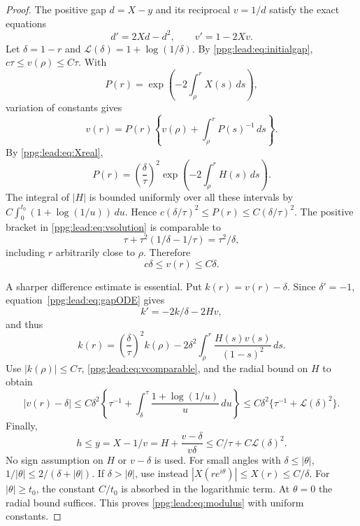 \documentclass[11pt,letterpaper]{article}
\theoremstyle{remark}\newtheorem{remark}[theorem]{Remark}
\numberwithin{equation}{section}
\begin{document}
\begin{proof}
The positive gap $d=X-y$ and its reciprocal $v=1/d$ satisfy the exact equations
\begin{equation}\label{ppg:lead:eq:gapODE}
 d'=2Xd-d^2,\qquad v'=1-2Xv.
\end{equation}
Let $\delta=1-r$ and $\mathcal L(\delta)=1+\log(1/\delta)$. By \eqref{ppg:lead:eq:initialgap}, $c\tau\le v(\rho)\le C\tau$. With
\[
 P(r)=\exp\left(-2\int_\rho^rX(s)\,ds\right),
\]
variation of constants gives
\begin{equation}\label{ppg:lead:eq:vsolution}
 v(r)=P(r)\left\{v(\rho)+\int_\rho^rP(s)^{-1}\,ds\right\}.
\end{equation}
By \eqref{ppg:lead:eq:Xreal},
\[
 P(r)=\left(\frac\delta\tau\right)^2
          \exp\left(-2\int_\rho^rH(s)\,ds\right).
\]
The integral of $|H|$ is bounded uniformly over all these intervals by
$C\int_0^{t_0}(1+\log(1/u))\,du$. Hence
$c(\delta/\tau)^2\le P(r)\le C(\delta/\tau)^2$.
The positive bracket in \eqref{ppg:lead:eq:vsolution} is comparable to
\[
 \tau+\tau^2(1/\delta-1/\tau)=\tau^2/\delta,
\]
including $r$ arbitrarily close to $\rho$. Therefore
\begin{equation}\label{ppg:lead:eq:vcomparable}
 c\delta\le v(r)\le C\delta.
\end{equation}

A sharper difference estimate is essential. Put $k(r)=v(r)-\delta$. Since $\delta'=-1$, equation~\eqref{ppg:lead:eq:gapODE} gives
\[
 k'=-2k/\delta-2Hv,
\]
and thus
\[
 k(r)=\left(\frac\delta\tau\right)^2k(\rho)
       -2\delta^2\int_\rho^r\frac{H(s)v(s)}{(1-s)^2}\,ds.
\]
Use $|k(\rho)|\le C\tau$, \eqref{ppg:lead:eq:vcomparable}, and the radial bound on $H$ to obtain
\begin{equation}\label{ppg:lead:eq:vdifference}
 |v(r)-\delta|\le C\delta^2
 \left\{\tau^{-1}+\int_\delta^\tau\frac{1+\log(1/u)}u\,du\right\}
 \le C\delta^2\{\tau^{-1}+\mathcal L(\delta)^2\}.
\end{equation}
Finally,
\[
 h\le y=X-1/v=H+\frac{v-\delta}{v\delta}
 \le C/\tau+C\mathcal L(\delta)^2.
\]
No sign assumption on $H$ or $v-\delta$ is used. For small angles with $\delta\le|\theta|$, $1/|\theta|\le2/(\delta+|\theta|)$. If $\delta>|\theta|$, use instead $|X(re^{i\theta})|\le X(r)\le C/\delta$. For $|\theta|\ge t_0$, the constant $C/t_0$ is absorbed in the logarithmic term. At $\theta=0$ the radial bound suffices. This proves \eqref{ppg:lead:eq:modulus} with uniform constants.
\end{proof}
\end{document}
